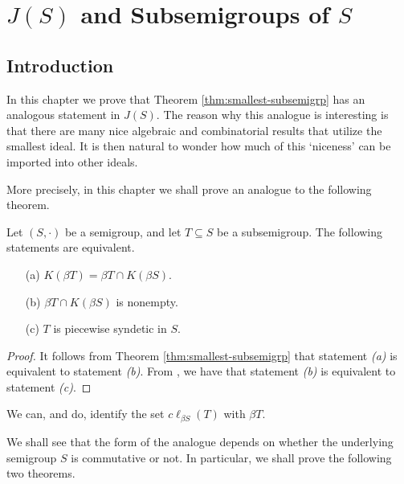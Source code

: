 
\chapter{$J(S)$ and Subsemigroups of $S$}
\section{Introduction}
In this chapter we prove that Theorem \ref{thm:smallest-subsemigrp} has an analogous statement in $J(S)$. 
The reason why this analogue is interesting is that there are many nice algebraic and combinatorial results that utilize the smallest ideal.%
It is then natural to wonder how much of this `niceness' can be imported into other ideals.

More precisely, in this chapter we shall prove an analogue to the following theorem.

\begin{thm}
  Let $(S, \cdot)$ be a semigroup, and let $T \subseteq S$ be a subsemigroup.
  The following statements are equivalent.
  \begin{itemize}
    \item[(a)] 
      $K(\beta T) = \beta T \cap K(\beta S)$.
    
    \item[(b)]
      $\beta T \cap K(\beta S)$ is nonempty.

    \item[(c)]
      $T$ is piecewise syndetic in $S$.
  \end{itemize}
\end{thm}
\begin{proof}
  It follows from Theorem \ref{thm:smallest-subsemigrp} that statement \textsl{(a)} is equivalent to statement \textsl{(b)}.
  From \cite[Theorem 4.40]{Hindman:1998fk}, we have that statement \textsl{(b)} is equivalent to statement \textsl{(c)}.
\end{proof}
\begin{rmk}
  We can, and do, identify the set $c \ell_{\beta S}(T)$ with $\beta T$. 
\end{rmk}

We shall see that the form of the analogue depends on whether the underlying semigroup $S$ is commutative or not. 
In particular, we shall prove the following two theorems.

